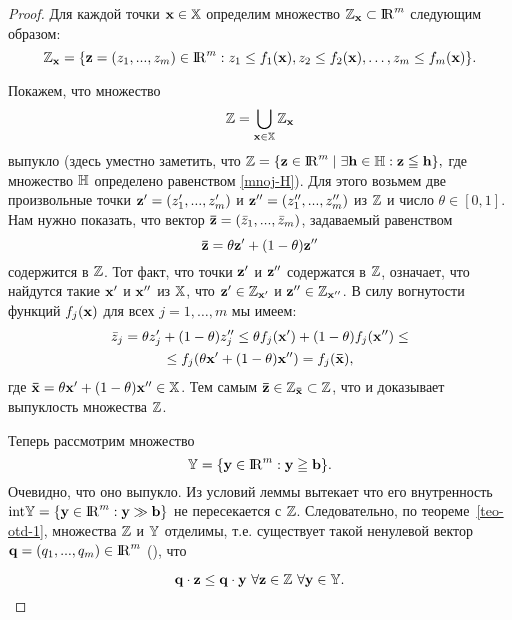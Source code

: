 \begin{proof}

Для каждой точки $\mathbf{x} \in \mathbb{X}$ определим множество
${\mathbb{Z}_{\mathbf{x}} \subset {\rm I\!R}^m}$ следующим образом:
\[
    \mathbb{Z}_{\mathbf{x}}=\{\mathbf{z}=(z_{1},...,z_{m})\in {\rm I\!R}^m: z_1\leq
    f_1(\mathbf{x}), z_2\leq f_2(\mathbf{x}), \ldots, z_m\leq f_m(\mathbf{x})\}.
\]

    Покажем, что множество
\[
    \mathbb{Z}= \mathop \bigcup \limits_{\mathbf{x} \in \mathbb{X}}\mathbb{Z}_{\mathbf{x}}
\]
    выпукло (здесь уместно заметить, что
$
    \mathbb{Z}=\{\mathbf{z}\in {\rm I\!R}^{m} \mid \exists \mathbf{h}\in \mathbb{H} : \mathbf{z}\leqq \mathbf{h}\},
$
    где множество $\mathbb{H}$ определено равенством \ref{mnoj-H}).
    Для этого возьмем две произвольные точки $\mathbf{z'}=(z'_{1},...,z'_{m})$
    и $\mathbf{z''}=(z''_{1},...,z''_{m})$
    из $\mathbb{Z}$ и число $\theta\in[0,1]$. Нам нужно
    показать, что вектор
    $\mathbf{\bar{z}}=(\bar{z}_{1},...,\bar{z}_{m})$,
    задаваемый равенством
\[
        \mathbf{\bar{z}}=\theta\mathbf{z'}+(1-\theta)\mathbf{z''}
\]
    содержится в $\mathbb{Z}$. Тот факт, что точки $\mathbf{z'}$ и
    $\mathbf{z''}$ содержатся в $\mathbb{Z}$, означает, что найдутся такие
    $\mathbf{x'}$ и $\mathbf{x''}$ из $\mathbb{X}$, что
     $\mathbf{z'} \in \mathbb{Z}_{\mathbf{x'}}$ и
    $\mathbf{z''} \in \mathbb{Z}_{\mathbf{x''}}$. В силу вогнутости функций
    $f_{j}(\mathbf{x})$ для всех $j=1,\ldots,m$ мы имеем:
\begin{multline*}
    \bar{z}_{j}= \theta z'_j + (1- \theta) z''_j\leq
    \theta f_j(\mathbf{x'}) + (1- \theta) f_j(\mathbf{x''}) \leq \\
    \leq f_j(\theta\mathbf{x'} +(1-\theta) \mathbf{x''})=f_j(\mathbf{\bar x}),
\end{multline*}
где $\mathbf{\bar x}=\theta\mathbf{x'} + (1- \theta) \mathbf{x''} \in \mathbb{X}$.
    Тем самым $\mathbf{\bar{z}}\in\mathbb{Z}_{\mathbf{\bar x}} \subset \mathbb{Z}$,
    что и  доказывает выпуклость множества $\mathbb{Z}$.

    Теперь рассмотрим множество
\[
    \mathbb{Y}=\{\mathbf{y} \in {\rm I\!R}^m: \mathbf{y} \geqq \mathbf{b}\}.
\]
    Очевидно, что оно выпукло. Из условий леммы вытекает  что его внутренность
$
    \text{int}\mathbb{Y}=\{\mathbf{y} \in {\rm I\!R}^m: \mathbf{y} \gg \mathbf{b}\}
$
    не пересекается с $\mathbb{Z}$. Следовательно,
по теореме~\ref{teo-otd-1}, множества $\mathbb{Z}$ и $\mathbb{Y}$ отделимы, т.е. существует такой
ненулевой вектор $\mathbf{q}=(q_{1},...,q_{m}) \in {\rm I\!R}^m$ (), что

\begin{equation*}\label{eq:ineq1_fundlemma}
    \mathbf{q} \cdot \mathbf{z} \leq \mathbf{q} \cdot \mathbf{y} \
    \forall \mathbf{z} \in \mathbb{Z} \ \forall \mathbf{y}\in\mathbb{Y}.
\end{equation*}


\end{proof}
